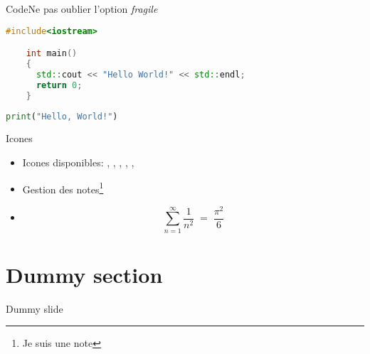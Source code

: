 \documentclass[10pt, aspectratio=169, french]{beamer}
\begin{document}
\begin{frame}[fragile]{Code}{Ne pas oublier l'option \emph{fragile}}

  \begin{lstlisting}[language=c++, frame=single]
    #include<iostream>

    int main()
    {
      std::cout << "Hello World!" << std::endl;
      return 0;
    }
  \end{lstlisting}

  \bigskip

  \begin{lstlisting}[language=python, frame=single]
  print("Hello, World!")
  \end{lstlisting}

\end{frame}



\begin{frame}{Icones}

  \begin{itemize}
  \item Icones disponibles: \cmark, \xmark, \ucmark, \mycal, \mycross, \myarrow
  \item Gestion des notes\footnote[frame]{Je suis une note}
  \item
    \begin{equation*}
      \sum_{n=1}^{\infty}\frac{1}{n^2} \;=\; \frac{\pi^2}{6}
    \end{equation*}
  \end{itemize}

\end{frame}




\section{Dummy section}

\begin{frame}{Dummy slide}
  \centering
  \begin{minipage}{0.9\textwidth}
    \justifying\lipsum[1]
  \end{minipage}
\end{frame}



\end{document}
